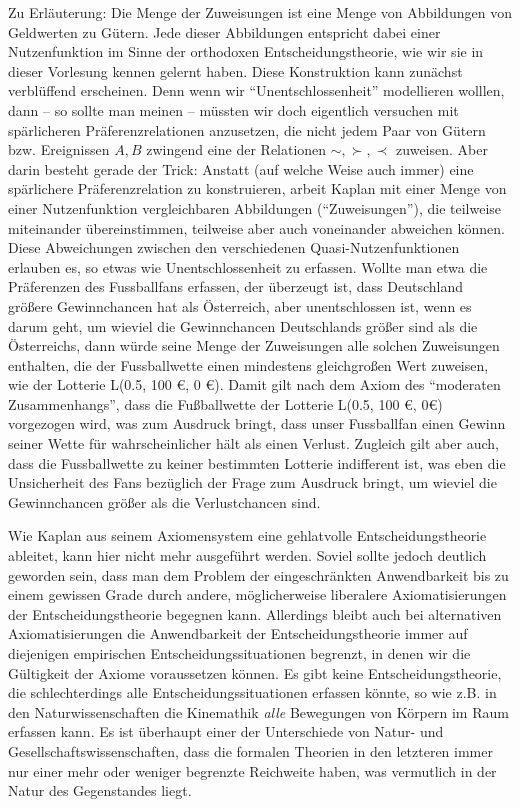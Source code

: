 Zu Erläuterung: Die Menge der Zuweisungen ist eine Menge von Abbildungen von
Geldwerten zu Gütern. Jede dieser Abbildungen entspricht dabei einer
Nutzenfunktion im Sinne der orthodoxen Entscheidungstheorie, wie wir sie in
dieser Vorlesung kennen gelernt haben. Diese Konstruktion kann zunächst
verblüffend erscheinen. Denn wenn wir "`Unentschlossenheit"' modellieren wolllen,
dann -- so sollte man meinen -- müssten wir doch eigentlich versuchen mit
spärlicheren Präferenzrelationen anzusetzen, die nicht jedem Paar von Gütern bzw.
Ereignissen $A,B$ zwingend eine der Relationen $\sim, \succ, \prec$ zuweisen.
Aber darin besteht gerade der Trick: Anstatt (auf welche Weise auch immer) eine
spärlichere Präferenzrelation zu konstruieren, arbeit Kaplan mit einer Menge von
einer Nutzenfunktion vergleichbaren Abbildungen ("`Zuweisungen"'), die teilweise
miteinander übereinstimmen, teilweise aber auch voneinander abweichen können.
Diese Abweichungen zwischen den verschiedenen Quasi-Nutzenfunktionen erlauben es,
so etwas wie Unentschlossenheit zu erfassen. Wollte man etwa die Präferenzen des
Fussballfans erfassen, der überzeugt ist, dass Deutschland größere Gewinnchancen
hat als Österreich, aber unentschlossen ist, wenn es darum geht, um wieviel die
Gewinnchancen Deutschlands größer sind als die Österreichs, dann würde seine
Menge der Zuweisungen alle solchen Zuweisungen enthalten, die der Fussballwette
einen mindestens gleichgroßen Wert zuweisen, wie der Lotterie L(0.5, 100 €, 0 €).
Damit gilt nach dem Axiom des "`moderaten Zusammenhangs"', dass die Fußballwette
der Lotterie L(0.5, 100 €, 0€) vorgezogen wird, was zum Ausdruck bringt, dass
unser Fussballfan einen Gewinn seiner Wette für wahrscheinlicher hält als einen
Verlust. Zugleich gilt aber auch, dass die Fussballwette zu keiner bestimmten
Lotterie indifferent ist, was eben die Unsicherheit des Fans bezüglich der Frage
zum Ausdruck bringt, um wieviel die Gewinnchancen größer als die Verlustchancen
sind.

Wie Kaplan aus seinem Axiomensystem eine gehlatvolle Entscheidungstheorie
ableitet, kann hier nicht mehr ausgeführt werden. Soviel sollte jedoch
deutlich geworden sein, dass man dem Problem der eingeschränkten Anwendbarkeit
bis zu einem gewissen Grade durch andere, möglicherweise liberalere
Axiomatisierungen der Entscheidungstheorie begegnen kann. Allerdings bleibt
auch bei alternativen Axiomatisierungen die Anwendbarkeit der
Entscheidungstheorie immer auf diejenigen empirischen Entscheidungssituationen
begrenzt, in denen wir die Gültigkeit der Axiome voraussetzen können. Es gibt
keine Entscheidungstheorie, die schlechterdings alle Entscheidungssituationen
erfassen könnte, so wie z.B. in den Naturwissenschaften die Kinemathik {\em
alle} Bewegungen von Körpern im Raum erfassen kann. Es ist überhaupt einer der
Unterschiede von Natur- und Gesellschaftswissenschaften, dass die formalen
Theorien in den letzteren immer nur einer mehr oder weniger begrenzte
Reichweite haben, was vermutlich in der Natur des Gegenstandes liegt.

